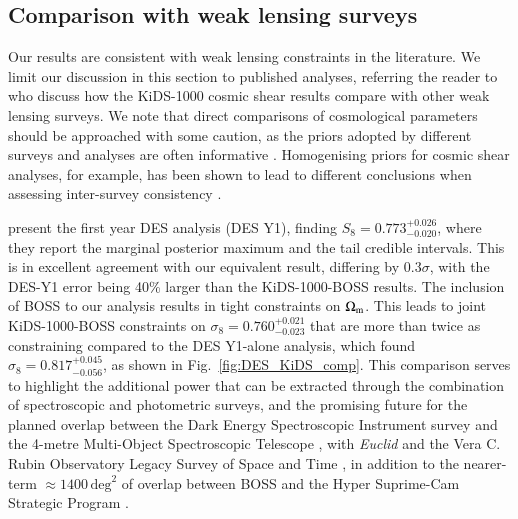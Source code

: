 \subsection{Comparison with weak lensing surveys}
\label{sec:WL_comp}
Our results are consistent with weak lensing constraints in the literature.   We limit our discussion in this section to published \tttp analyses, referring the reader to \citet{asgari/etal:inprep} who discuss how the KiDS-1000 cosmic shear results compare with other weak lensing surveys.   We note that direct comparisons of cosmological parameters should be approached with some caution, as the priors adopted by different surveys and analyses are often informative \citep[see section 6.1 in][]{joachimi/etal:inprep}.   Homogenising priors for cosmic shear analyses, for example, has been shown to lead to different conclusions when assessing inter-survey consistency \citep{chang/etal:2019, joudaki/etal:2020, asgari/etal:2020_KD}.   

\citet{abbott/etal:2018} present the first year \tttp DES analysis (DES Y1), finding $S_8=0.773^{+0.026}_{-0.020}$, where they report the marginal posterior maximum and the tail credible intervals.  
This is in excellent agreement with our equivalent result, differing by $0.3\sigma$, with the DES-Y1 error being 40\% larger than the KiDS-1000-BOSS \tttp results.  The inclusion of BOSS to our \tttp analysis results in tight constraints on $\Omega_{\rm m}$.  
This leads to joint KiDS-1000-BOSS constraints on $\sigma_8=0.760^{+0.021}_{-0.023}$ that are more than twice as constraining compared to the DES Y1-alone \tttp analysis, which found $\sigma_8=0.817^{+0.045}_{-0.056}$, as shown in Fig.~\ref{fig:DES_KiDS_comp}. 
This comparison serves to highlight the additional power that can be extracted through the combination of spectroscopic and photometric surveys,  and the promising future for the planned overlap between the Dark Energy Spectroscopic Instrument survey \citep{DESI/etal:2016} and the 4-metre Multi-Object Spectroscopic Telescope \citep[4MOST,][]{richard/etal:2019},
with {\it Euclid} and the Vera C. Rubin Observatory Legacy Survey of Space and Time \citep{laureijs/etal:2011,lsst/etal:2009}, in addition to the nearer-term $\approx\!1400\,\mathrm{deg}^{2}$ of overlap between BOSS and the Hyper Suprime-Cam Strategic Program \citep[HSC,][]{aihara/etal:2019}. 

